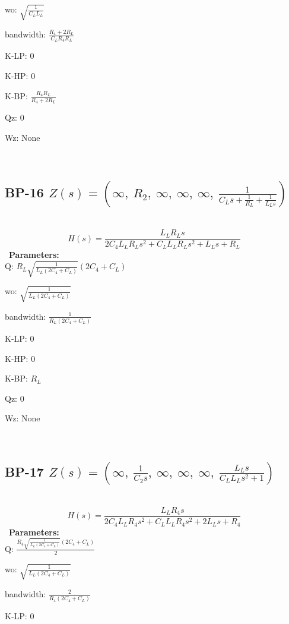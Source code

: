 \documentclass{article}
\begin{document}
wo: $\sqrt{\frac{1}{C_{L} L_{L}}}$\ 

bandwidth: $\frac{R_{4} + 2 R_{L}}{C_{L} R_{4} R_{L}}$\ 

K-LP: $0$\ 

K-HP: $0$\ 

K-BP: $\frac{R_{4} R_{L}}{R_{4} + 2 R_{L}}$\ 

Qz: $0$\ 

Wz: $\text{None}$\ 

\ 

\subsection{BP-16 $Z(s) = \left( \infty, \  R_{2}, \  \infty, \  \infty, \  \infty, \  \frac{1}{C_{L} s + \frac{1}{R_{L}} + \frac{1}{L_{L} s}}\right)$ } \ 
\textbf{\[H(s) = \frac{L_{L} R_{L} s}{2 C_{4} L_{L} R_{L} s^{2} + C_{L} L_{L} R_{L} s^{2} + L_{L} s + R_{L}}\] } \ 
\textbf{Parameters:}\\ 

Q: $R_{L} \sqrt{\frac{1}{L_{L} \left(2 C_{4} + C_{L}\right)}} \left(2 C_{4} + C_{L}\right)$\ 

wo: $\sqrt{\frac{1}{L_{L} \left(2 C_{4} + C_{L}\right)}}$\ 

bandwidth: $\frac{1}{R_{L} \left(2 C_{4} + C_{L}\right)}$\ 

K-LP: $0$\ 

K-HP: $0$\ 

K-BP: $R_{L}$\ 

Qz: $0$\ 

Wz: $\text{None}$\ 

\ 

\subsection{BP-17 $Z(s) = \left( \infty, \  \frac{1}{C_{2} s}, \  \infty, \  \infty, \  \infty, \  \frac{L_{L} s}{C_{L} L_{L} s^{2} + 1}\right)$ } \ 
\textbf{\[H(s) = \frac{L_{L} R_{4} s}{2 C_{4} L_{L} R_{4} s^{2} + C_{L} L_{L} R_{4} s^{2} + 2 L_{L} s + R_{4}}\] } \ 
\textbf{Parameters:}\\ 

Q: $\frac{R_{4} \sqrt{\frac{1}{L_{L} \left(2 C_{4} + C_{L}\right)}} \left(2 C_{4} + C_{L}\right)}{2}$\ 

wo: $\sqrt{\frac{1}{L_{L} \left(2 C_{4} + C_{L}\right)}}$\ 

bandwidth: $\frac{2}{R_{4} \left(2 C_{4} + C_{L}\right)}$\ 

K-LP: $0$\ 
\end{document}
